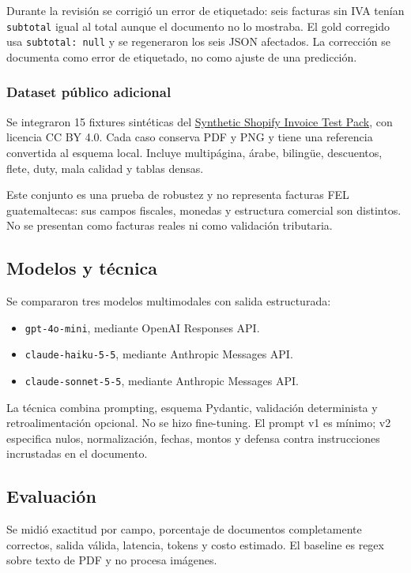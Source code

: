 \documentclass[11pt,a4paper]{article}
\begin{document}
Durante la revisión se corrigió un error de etiquetado: seis facturas sin IVA tenían \texttt{subtotal} igual al total aunque el documento no lo mostraba. El gold corregido usa \texttt{subtotal: null} y se regeneraron los seis JSON afectados. La corrección se documenta como error de etiquetado, no como ajuste de una predicción.

\subsubsection{Dataset público adicional}
Se integraron 15 fixtures sintéticas del \href{https://github.com/SalorWorks/shopify-invoice-test-pack}{Synthetic Shopify Invoice Test Pack}, con licencia CC BY 4.0. Cada caso conserva PDF y PNG y tiene una referencia convertida al esquema local. Incluye multipágina, árabe, bilingüe, descuentos, flete, duty, mala calidad y tablas densas.

Este conjunto es una prueba de robustez y no representa facturas FEL guatemaltecas: sus campos fiscales, monedas y estructura comercial son distintos. No se presentan como facturas reales ni como validación tributaria.

\subsection{Modelos y técnica}
Se compararon tres modelos multimodales con salida estructurada:
\begin{itemize}
  \item \texttt{gpt-4o-mini}, mediante OpenAI Responses API.
  \item \texttt{claude-haiku-5-5}, mediante Anthropic Messages API.
  \item \texttt{claude-sonnet-5-5}, mediante Anthropic Messages API.
\end{itemize}

La técnica combina prompting, esquema Pydantic, validación determinista y retroalimentación opcional. No se hizo fine-tuning. El prompt v1 es mínimo; v2 especifica nulos, normalización, fechas, montos y defensa contra instrucciones incrustadas en el documento.

\subsection{Evaluación}
Se midió exactitud por campo, porcentaje de documentos completamente correctos, salida válida, latencia, tokens y costo estimado. El baseline es regex sobre texto de PDF y no procesa imágenes.
\end{document}
